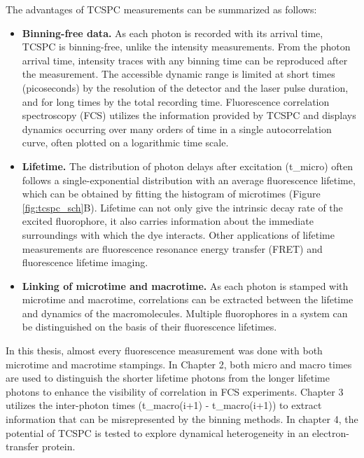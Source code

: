 The advantages of TCSPC measurements can be summarized as follows:
\begin{itemize}
	\item \textbf{Binning-free data.} As each photon is recorded with its arrival time, TCSPC is binning-free, unlike the intensity measurements.
	From the photon arrival time, intensity traces with any binning time can be reproduced after the measurement.
	The accessible dynamic range is limited at short times (picoseconds) by the resolution of the detector and the laser pulse duration, and for long times by the total recording time.
	Fluorescence correlation spectroscopy (FCS) utilizes the information provided by TCSPC and displays dynamics occurring over many orders of time in a single autocorrelation curve, often plotted on a logarithmic time scale.
	\item \textbf{Lifetime.} The distribution of photon delays after excitation (t\_micro) often follows a single-exponential distribution with an average fluorescence lifetime, which can be obtained by fitting the histogram of microtimes (Figure \ref{fig:tcspc_sch}B).
	Lifetime can not only give the intrinsic decay rate of the excited fluorophore, it also carries information about the immediate surroundings with which the dye interacts.
	Other applications of lifetime measurements are fluorescence resonance energy transfer (FRET) and fluorescence lifetime imaging.\cite{selvin2000the,lakowicz1992fluorescence} 
	\item \textbf{Linking of microtime and macrotime.} As each photon is stamped with microtime and macrotime, correlations can be extracted between the lifetime and dynamics of the macromolecules.
	Multiple fluorophores in a system can be distinguished on the basis of their fluorescence lifetimes.
\end{itemize}
In this thesis, almost every fluorescence measurement was done with both microtime and macrotime stampings.
In Chapter 2, both micro and macro times are used to distinguish the shorter lifetime photons from the longer lifetime photons to enhance the visibility of correlation in FCS experiments.
Chapter 3 utilizes the inter-photon times (t\_macro(i+1) - t\_macro(i+1)) to extract information that can be misrepresented by the binning methods.
In chapter 4, the potential of TCSPC is tested to explore dynamical heterogeneity in an electron-transfer protein. 
%
